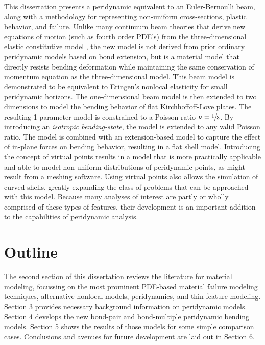 This dissertation presents a peridynamic  equivalent to an Euler-Bernoulli beam, along with a methodology for representing non-uniform cross-sections, plastic behavior, and failure.
Unlike many continuum beam theories that derive new equations of motion (such as fourth order PDE's) from the three-dimensional elastic constitutive model , the new model is not derived from prior ordinary peridynamic models based on bond extension, but is a material model that directly resists bending deformation while maintaining the same conservation of momentum equation as the three-dimensional model.
This beam model is demonstrated to be equivalent to Eringen's nonlocal elasticity for small peridynamic horizons.
The one-dimensional beam model is then extended to two dimensions to model the bending behavior of flat Kirchhoffoff-Love plates.
The resulting 1-parameter model is constrained to a Poisson ratio \(\nu=\sfrac{1}{3}\).  
By introducing an \emph{isotropic bending-state}, the model is extended to any valid Poisson ratio.  
The model is combined with an extension-based model to capture the effect of in-plane forces on bending behavior, resulting in a flat shell model.
Introducing the concept of virtual points  results in a model that is more practically applicable and able to model non-uniform distributions of peridynamic points, as might result from a meshing software.
Using virtual points also allows the simulation of curved shells, greatly expanding the class of problems that can be approached with this model.
Because many analyses of interest are partly or wholly comprised of these types of features, their development is an important addition to the capabilities of peridynamic analysis.

\section{Outline}

The second section  of this dissertation reviews the literature for material modeling, focussing on the most prominent PDE-based material failure modeling techniques, alternative nonlocal models, peridynamics, and thin feature modeling. Section 3  provides necessary background information on peridynamic models. Section 4  develops the new bond-pair and bond-multiple peridynamic bending models. Section 5 shows the results of those models for some simple comparison cases. Conclusions and avenues for future development are laid out in Section 6. 
